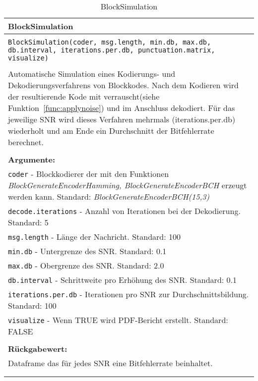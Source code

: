 \begin{longtable}{|p{\textwidth}|}
\hline
\rowcolor{lightblue}BlockSimulation\\
\hline
\\
\texttt{BlockSimulation(coder, msg.length, min.db, max.db, db.interval, iterations.per.db, punctuation.matrix, visualize)}\\
\\
Automatische Simulation eines Kodierungs- und Dekodierungsverfahrens von Blockkodes. Nach dem Kodieren wird der resultierende Kode mit verrauscht(siehe Funktion~\ref{func:applynoise}) und im Anschluss dekodiert. Für das jeweilige SNR wird dieses Verfahren mehrmals (iterations.per.db) wiederholt und am Ende ein Durchschnitt der Bitfehlerrate berechnet.\\
\\
\textbf{Argumente:}\\
\texttt{coder} - Blockkodierer der mit den Funktionen \emph{BlockGenerateEncoderHamming, BlockGenerateEncoderBCH} erzeugt werden kann. Standard: \emph{BlockGenerateEncoderBCH(15,3)}\\
\texttt{decode.iterations} - Anzahl von Iterationen bei der Dekodierung. Standard: 5\\
\texttt{msg.length} - Länge der Nachricht. Standard: 100\\
\texttt{min.db} - Untergrenze des SNR. Standard: 0.1\\
\texttt{max.db} - Obergrenze des SNR. Standard: 2.0\\
\texttt{db.interval} - Schrittweite pro Erhöhung des SNR. Standard: 0.1\\
\texttt{iterations.per.db} - Iterationen pro SNR zur Durchschnittsbildung. Standard: 100\\
\texttt{visualize} - Wenn TRUE wird PDF-Bericht erstellt. Standard: FALSE\\
\\
\textbf{Rückgabewert:}\\
Dataframe das für jedes SNR eine Bitfehlerrate beinhaltet.\\
\\
\hline
\caption{BlockSimulation}
\label{func:block_simu}
\end{longtable}
